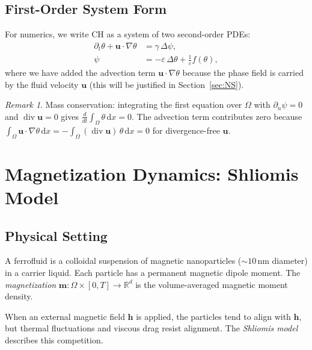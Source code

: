 \documentclass[11pt,a4paper]{article}
\theoremstyle{definition}
\theoremstyle{remark}
\newtheorem{remark}[proposition]{Remark}
\newcommand{\R}{\mathbb{R}}
\newcommand{\dd}{\,\mathrm{d}}
\newcommand{\dt}{\partial_t}
\newcommand{\dn}{\partial_n}
\newcommand{\dv}{\operatorname{div}}
\newcommand{\grad}{\nabla}
\newcommand{\eps}{\varepsilon}
\newcommand{\bfu}{\bm{u}}
\newcommand{\bfm}{\bm{m}}
\newcommand{\bfh}{\bm{h}}
\begin{document}
\subsection{First-Order System Form}

For numerics, we write CH as a system of two second-order PDEs:
\begin{equation}
  \label{eq:CH-system}
  \boxed{
  \begin{aligned}
    \dt\theta + \bfu \cdot \grad\theta &= \gamma\,\Delta\psi, \\
    \psi &= -\eps\,\Delta\theta + \frac{1}{\eps} f(\theta),
  \end{aligned}
  }
\end{equation}
where we have added the advection term $\bfu \cdot \grad\theta$ because
the phase field is carried by the fluid velocity $\bfu$ (this will be
justified in Section~\ref{sec:NS}).

\begin{remark}
  Mass conservation: integrating the first equation over $\Omega$ with
  $\dn\psi = 0$ and $\dv\bfu = 0$ gives
  $\frac{d}{dt}\int_\Omega \theta \dd x = 0$.
  The advection term contributes zero because
  $\int_\Omega \bfu \cdot \grad\theta \dd x
   = -\int_\Omega (\dv\bfu)\,\theta \dd x = 0$
  for divergence-free $\bfu$.
\end{remark}


\section{Magnetization Dynamics: Shliomis Model}
\label{sec:shliomis}

\subsection{Physical Setting}

A ferrofluid is a colloidal suspension of magnetic nanoparticles
($\sim 10$\,nm diameter) in a carrier liquid. Each particle has a
permanent magnetic dipole moment. The \emph{magnetization}
$\bfm : \Omega \times [0,T] \to \R^d$ is the volume-averaged magnetic
moment density.

When an external magnetic field $\bfh$ is applied, the particles tend to
align with $\bfh$, but thermal fluctuations and viscous drag resist
alignment. The \emph{Shliomis model} describes this competition.
\end{document}
